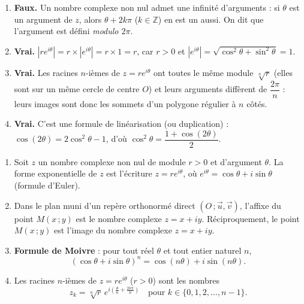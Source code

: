 \documentclass[11pt]{article}
\newcommand{\cle}[1]{{\popxbold\color{popdark}#1}}
\begin{document}
\begin{corrige}
\begin{enumerate}
\item \textbf{Faux.} Un nombre complexe non nul admet une infinité d'arguments : si $\theta$ est un argument de $z$, alors $\theta + 2k\pi$ ($k \in \mathbb{Z}$) en est un aussi. On dit que l'argument est défini \emph{modulo $2\pi$}.
\item \textbf{Vrai.} $|re^{i\theta}| = r \times |e^{i\theta}| = r \times 1 = r$, car $r > 0$ et $|e^{i\theta}| = \sqrt{\cos^2\theta + \sin^2\theta} = 1$.
\item \textbf{Vrai.} Les racines $n$-ièmes de $z = re^{i\theta}$ ont toutes le même module $\sqrt[n]{r}$ (elles sont sur un même cercle de centre $O$) et leurs arguments diffèrent de $\dfrac{2\pi}{n}$ : leurs images sont donc les sommets d'un polygone régulier à $n$ côtés.
\item \textbf{Vrai.} C'est une formule de linéarisation (ou duplication) : $\cos(2\theta) = 2\cos^2\theta - 1$, d'où $\cos^2\theta = \dfrac{1 + \cos(2\theta)}{2}$.
\end{enumerate}
\end{corrige}

\begin{corrige}
\begin{enumerate}
\item Soit $z$ un nombre complexe non nul de module $r > 0$ et d'argument $\theta$. La \cle{forme exponentielle} de $z$ est l'écriture $z = re^{i\theta}$, où $e^{i\theta} = \cos\theta + i\sin\theta$ (formule d'Euler).
\item Dans le plan muni d'un repère orthonormé direct $(O\,;\vec{u},\vec{v})$, l'\cle{affixe} du point $M(x\,;y)$ est le nombre complexe $z = x + iy$. Réciproquement, le point $M(x\,;y)$ est l'\cle{image} du nombre complexe $z = x + iy$.
\item \textbf{Formule de Moivre} : pour tout réel $\theta$ et tout entier naturel $n$,
\[ (\cos\theta + i\sin\theta)^n = \cos(n\theta) + i\sin(n\theta). \]
\item Les racines $n$-ièmes de $z = re^{i\theta}$ ($r>0$) sont les nombres
\[ z_k = \sqrt[n]{r}\, e^{i\left(\frac{\theta}{n} + \frac{2k\pi}{n}\right)} \quad \text{pour } k \in \{0, 1, 2, \ldots, n-1\}. \]
\end{enumerate}
\end{corrige}
\end{document}
